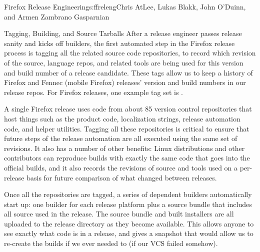 \begin{aosachapter}{Firefox Release Engineering}{s:ffreleng}{Chris AtLee, Lukas Blakk, John O'Duinn, and Armen Zambrano Gasparnian}
\begin{aosasect1}{Tagging, Building, and Source Tarballs}
After a release engineer passes release sanity and kicks off builders,
the first automated step in the Firefox release process is tagging all
the related source code repositories, to record which revision of
the source, language repos, and related tools are being used for this
version and build number of a release candidate. 
These tags allow us
to keep a history of Firefox and Fennec (mobile Firefox) releases'
version and build numbers in our release repos.
For Firefox releases, one example tag set is
.  

A single Firefox
release uses code from about 85 version control repositories that host
things such as the product code, localization strings, release
automation code, and helper utilities. Tagging all these repositories
is critical to ensure that future steps of the release
automation are all executed using the same set of revisions. It also has a
number of other benefits: Linux distributions and other contributors
can reproduce builds with exactly the same code that goes into the
official builds, and it also records the revisions of source and tools
used on a per-release basis for future comparison of what changed
between releases. 
    
Once all the repositories are tagged, a series of dependent builders
automatically start up: one builder for each release platform plus a
source bundle that includes all source used in the release.  The source
bundle and built installers are all uploaded to the release directory
as they become available.  This allows anyone to see exactly what code
is in a release, and gives a snapshot that would allow us to re-create
the builds if we ever needed to (if our VCS failed somehow).
    

\end{aosasect1}
\end{aosachapter}
